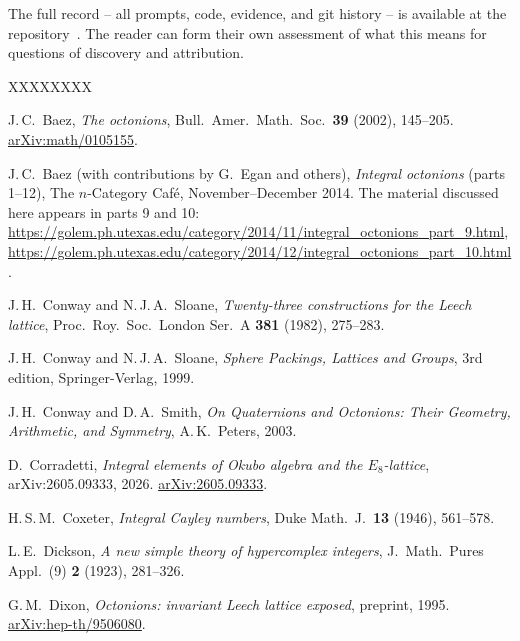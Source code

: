 \documentclass[twoside,english]{paper}
\numberwithin{equation}{section}
\numberwithin{figure}{section}
\theoremstyle{definition}
\theoremstyle{remark}
\begin{document}
The full record -- all prompts, code, evidence, and git history --
is available at the repository~\cite{repo}.  The reader can form
their own assessment of what this means for questions of discovery
and attribution.


\begin{thebibliography}{XXXXXXXX}

J.\,C.~Baez,
\emph{The octonions},
Bull.\ Amer.\ Math.\ Soc.\ \textbf{39} (2002), 145--205.
\href{https://arxiv.org/abs/math/0105155}{arXiv:math/0105155}.

J.\,C.~Baez (with contributions by G.~Egan and others),
\emph{Integral octonions} (parts 1--12),
The $n$-Category Caf\'e, November--December 2014.
The material discussed here appears in parts 9 and 10:
\url{https://golem.ph.utexas.edu/category/2014/11/integral_octonions_part_9.html},
\url{https://golem.ph.utexas.edu/category/2014/12/integral_octonions_part_10.html}.

J.\,H.~Conway and N.\,J.\,A.~Sloane,
\emph{Twenty-three constructions for the Leech lattice},
Proc.\ Roy.\ Soc.\ London Ser.\ A \textbf{381} (1982), 275--283.

J.\,H.~Conway and N.\,J.\,A.~Sloane,
\emph{Sphere Packings, Lattices and Groups},
3rd edition, Springer-Verlag, 1999.

J.\,H.~Conway and D.\,A.~Smith,
\emph{On Quaternions and Octonions: Their Geometry, Arithmetic, and
Symmetry},
A.\,K.~Peters, 2003.

D.~Corradetti,
\emph{Integral elements of Okubo algebra and the $E_8$-lattice},
arXiv:2605.09333, 2026.
\href{https://arxiv.org/abs/2605.09333}{arXiv:2605.09333}.

H.\,S.\,M.~Coxeter,
\emph{Integral Cayley numbers},
Duke Math.\ J.\ \textbf{13} (1946), 561--578.

L.\,E.~Dickson,
\emph{A new simple theory of hypercomplex integers},
J.~Math.\ Pures Appl.\ (9) \textbf{2} (1923), 281--326.

G.\,M.~Dixon,
\emph{Octonions: invariant Leech lattice exposed},
preprint, 1995.
\href{https://arxiv.org/abs/hep-th/9506080}{arXiv:hep-th/9506080}.


\end{thebibliography}
\end{document}
